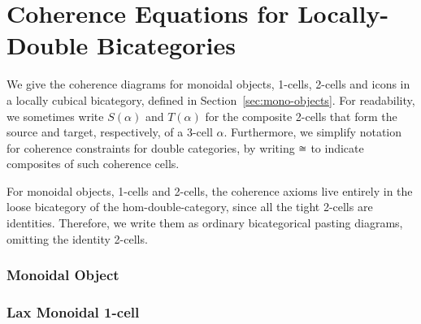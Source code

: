\section{Coherence Equations for Locally-Double Bicategories}
\label{ap:coherence}

We give the coherence diagrams for monoidal objects, 1-cells, 2-cells and icons in a locally cubical bicategory, defined in Section~\ref{sec:mono-objects}. For readability, we sometimes write $S(\alpha)$ and $T(\alpha)$ for the composite 2-cells that form the source and target, respectively, of a 3-cell $\alpha$.
Furthermore, we simplify notation for coherence constraints for double categories, by writing $\cong$ to indicate composites of such coherence cells.

For monoidal objects, 1-cells and 2-cells, the coherence axioms live entirely in the loose bicategory of the hom-double-category, since all the tight 2-cells are identities. Therefore, we write them as
ordinary bicategorical pasting diagrams, omitting the identity
2-cells.  

\subsubsection*{Monoidal Object}

 \newpage
 \newpage
 \newpage


\subsubsection*{Lax Monoidal 1-cell}

 \newpage
 \newpage



%


